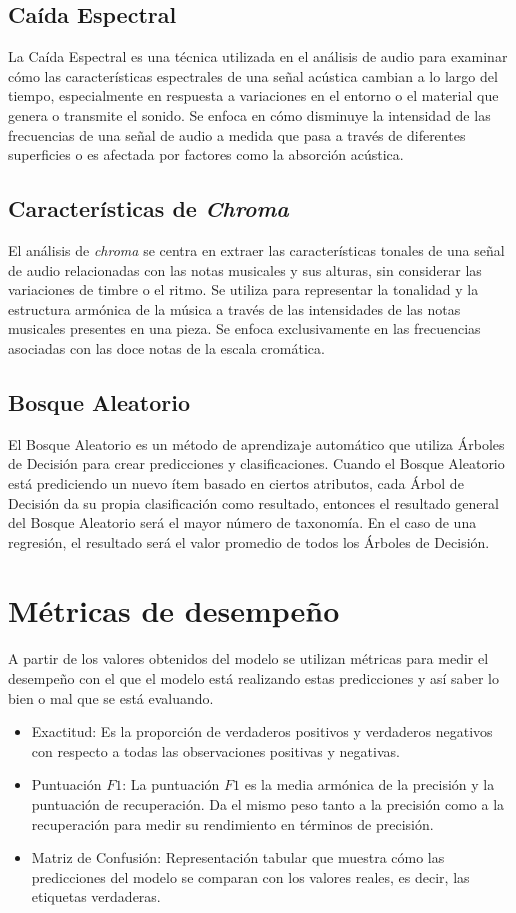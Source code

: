 \documentclass{article}
\begin{document}
\subsection{Caída Espectral}
La Caída Espectral es una técnica utilizada en el análisis de audio para examinar cómo las características espectrales de una señal acústica cambian a lo largo del tiempo, especialmente en respuesta a variaciones en el entorno o el material que genera o transmite el sonido. Se enfoca en cómo disminuye la intensidad de las frecuencias de una señal de audio a medida que pasa a través de diferentes superficies o es afectada por factores como la absorción acústica.

\subsection{Características de \textit{Chroma}}
El análisis de \textit{chroma} se centra en extraer las características tonales de una señal de audio relacionadas con las notas musicales y sus alturas, sin considerar las variaciones de timbre o el ritmo. Se utiliza para representar la tonalidad y la estructura armónica de la música a través de las intensidades de las notas musicales presentes en una pieza. Se enfoca exclusivamente en las frecuencias asociadas con las doce notas de la escala cromática.

\subsection{Bosque Aleatorio}
El Bosque Aleatorio es un método de aprendizaje automático que utiliza Árboles de Decisión para crear predicciones y clasificaciones. Cuando el Bosque Aleatorio está prediciendo un nuevo ítem basado en ciertos atributos, cada Árbol de Decisión da su propia clasificación como resultado, entonces el resultado general del Bosque Aleatorio será el mayor número de taxonomía. En el caso de una regresión, el resultado será el valor promedio de todos los Árboles de Decisión.

\section{Métricas de desempeño}
A partir de los valores obtenidos del modelo se utilizan métricas para medir el desempeño con el que el modelo está realizando estas predicciones y así saber lo bien o mal que se está evaluando.

\begin{itemize}
    \item Exactitud: Es la proporción de verdaderos positivos y verdaderos negativos con respecto a todas las observaciones positivas y negativas.
    \item Puntuación $F1$: La puntuación $F1$ es la media armónica de la precisión y la puntuación de recuperación. Da el mismo peso tanto a la precisión como a la recuperación para medir su rendimiento en términos de precisión.
    \item Matriz de Confusión: Representación tabular que muestra cómo las predicciones del modelo se comparan con los valores reales, es decir, las etiquetas verdaderas.
\end{itemize}
    
\end{document}
